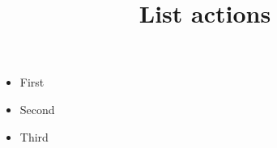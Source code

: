 \documentclass{ltx-talk}
\title{List actions}
\begin{document}
\begin{frame}
  \begin{itemize}[<alert@+>]
    \item First
    \item Second
    \item Third
  \end{itemize}
\end{frame}
\end{document}
